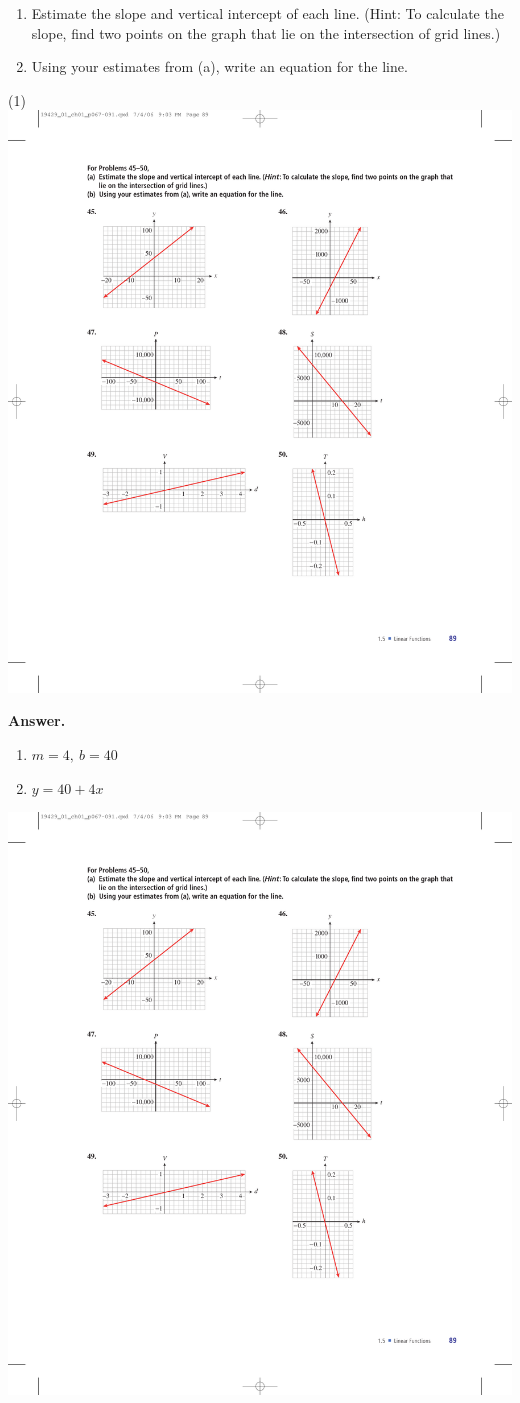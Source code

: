 \documentclass[10pt,]{book}
\theoremstyle{plain}
\theoremstyle{definition}
\theoremstyle{definition}
\theoremstyle{definition}
\theoremstyle{definition}
\numberwithin{equation}{part}
\begin{document}
\begin{exerciselist}
\begin{enumerate}[label=*\alph**]
\item\hypertarget{li-1239}{}Estimate the slope and vertical intercept of each line. (Hint: To calculate the slope, find two points on the graph that lie on the intersection of grid lines.)%
\item\hypertarget{li-1240}{}Using your estimates from (a), write an equation for the line.%
\end{enumerate}
%
\begin{exercisegroup}(1)
\exercise[45.]\hypertarget{exercise-331}{}\includegraphics[width=0.6\linewidth]{images/fig-ex-1-5-45}
%
\par\smallskip
\noindent\textbf{Answer.}\hypertarget{answer-186}{}\quad
\leavevmode%
\begin{enumerate}[label=*\alph**]
\item\hypertarget{li-1241}{}\(m = 4, ~b = 40\)%
\item\hypertarget{li-1242}{}\(y = 40 + 4x\)%
\end{enumerate}
%
\exercise[46.]\hypertarget{exercise-332}{}\includegraphics[width=0.5\linewidth]{images/fig-ex-1-5-46}

\end{exercisegroup}
\end{exerciselist}
\end{document}
